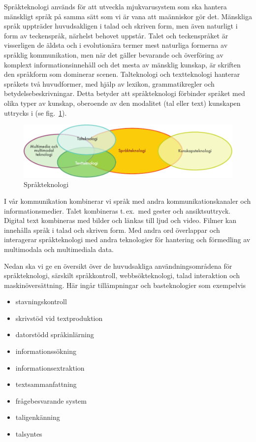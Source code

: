 \begin{multicols}{2}

Språkteknologi används för att utveckla mjukvarusystem som ska hantera
mänskligt språk på samma sätt som vi är vana att maänniskor gör
det. Mänskliga språk uppträder huvudsakligen i talad och skriven form,
men även naturligt i form av teckenspråk, närhelst behovet
uppstår. Talet och teckenspråket är visserligen de äldsta och i
evolutionära termer mest naturliga formerna av språklig kommunikation,
men när det gäller bevarande och överföring av komplext
informationsinnehåll och det mesta av mänsklig kunskap, är skriften
den språkform som dominerar scenen. Talteknologi och textteknologi
hanterar språkets två huvudformer, med hjälp av lexikon,
grammatikregler och betydelsebeskrivningar. Detta betyder att
språkteknologi förbinder språket med olika typer av kunskap, oberoende
av den modalitet (tal eller text) kunskapen uttrycks i (se fig.~\ref{fig:ltincontext_sv}).

\begin{figure}[htb]
  \center
  \includegraphics[width=\textwidth]{../_media/swedish/language_technologies}
  \caption{Språkteknologi}
  \label{fig:ltincontext_sv}
\end{figure}

I vår kommunikation kombinerar vi språk med andra
kommunikationskanaler och informationsmedier. Talet kombineras
t.\,ex.~med gester och ansiktsuttryck. Digital text kombineras med
bilder och länkas till ljud och video. Filmer kan innehålla språk i
talad och skriven form. Med andra ord överlappar och interagerar
språkteknologi med andra teknologier för hantering och förmedling av
multimodala och multimediala data.

Nedan ska vi ge en översikt över de huvudsakliga användningsområdena
för språkteknologi, särskilt språkkontroll, webbsökteknologi, talad
interaktion och maskinöversättning. Här ingår tillämpningar och
basteknologier som exempelvis

\begin{itemize}
\item stavningskontroll
\item skrivstöd vid textproduktion
\item datorstödd språkinlärning
\item informationssökning
\item informationsextraktion
\item textsammanfattning
\item frågebesvarande system
\item taligenkänning
\item talsyntes
\end{itemize}


\end{multicols}
